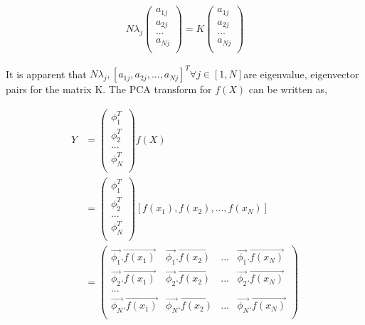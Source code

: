 \documentclass[11pt, a4paper]{article}
\begin{document}
\begin{align*}
    N\lambda_j \begin{pmatrix}
        a_{1j} \\
        a_{2j} \\
        ... \\
        a_{Nj} \\
    \end{pmatrix} = K \begin{pmatrix}
        a_{1j} \\
        a_{2j} \\
        ... \\
        a_{Nj} \\
    \end{pmatrix}
\end{align*}

It is apparent that $N\lambda_j, [a_{1j}, a_{2j}, ..., a_{Nj}]^T \forall j \in [1, N]$are eigenvalue, eigenvector pairs for the matrix K. The PCA transform for $f(X)$ can be written as,

\begin{align*}
    Y &= \begin{pmatrix}
        \phi_1^T \\
        \phi_2^T \\
        ... \\
        \phi_N^T \\
    \end{pmatrix} f(X) \\
      &= \begin{pmatrix}
        \phi_1^T \\
        \phi_2^T \\
        ... \\
        \phi_N^T \\
    \end{pmatrix} [f(x_1), f(x_2), ..., f(x_N)] \\
      &= \begin{pmatrix}
          \vec{\phi_1}.\vec{f(x_1)} & \vec{\phi_1}.\vec{f(x_2)} & ... & \vec{\phi_1}.\vec{f(x_N)} \\
          \vec{\phi_2}.\vec{f(x_1)} & \vec{\phi_2}.\vec{f(x_2)} & ... & \vec{\phi_2}.\vec{f(x_N)} \\
          ... \\
          \vec{\phi_N}.\vec{f(x_1)} & \vec{\phi_N}.\vec{f(x_2)} & ... & \vec{\phi_N}.\vec{f(x_N)} \\
\end{pmatrix}       
\end{align*} 
\end{document}
